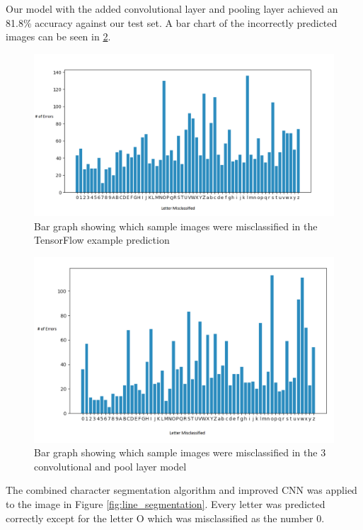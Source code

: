 \documentclass[11pt]{article}
\begin{document}
Our model with the added convolutional layer and pooling layer achieved an 81.8\% accuracy against our test set. A bar chart of the incorrectly predicted images can be seen in \ref{fig:model_2_error}.

\begin{figure}
    \centering
    \includegraphics[scale=0.3]{model_1_errors-wlabels.png}
    \caption{Bar graph showing which sample images were misclassified in the TensorFlow example prediction}
    \label{fig:model_1_error}
\end{figure}

\begin{figure}
    \centering
    \includegraphics[scale=0.3]{model_2_errors-wlabels.png}
    \caption{Bar graph showing which sample images were misclassified in the 3 convolutional and pool layer model}
    \label{fig:model_2_error}
\end{figure}

The combined character segmentation algorithm and improved CNN was applied to the image in Figure \ref{fig:line_segmentation}. Every letter was predicted correctly except for the letter O which was misclassified as the number 0.
\end{document}
